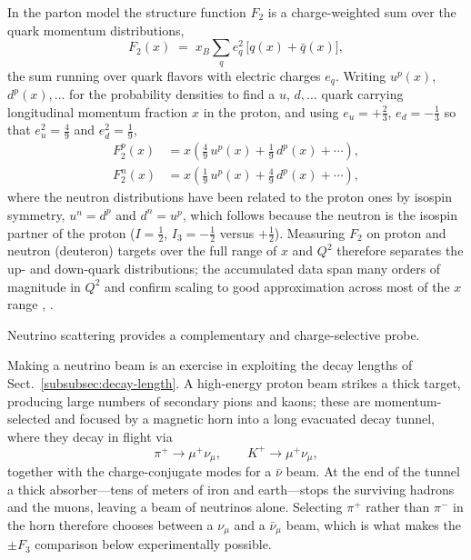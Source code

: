 In the parton model the structure function $F_{2}$ is a charge-weighted sum over the
quark momentum distributions,
\begin{equation}
    F_{2}(x) \;=\; x_{B}\sum_{q} e_{q}^{2}\,\bigl[q(x) + \bar q(x)\bigr],
    \label{eq:F2-parton}
\end{equation}
the sum running over quark flavors with electric charges $e_{q}$. Writing $u^{p}(x)$,
$d^{p}(x),\dots$ for the probability densities to find a $u$, $d,\dots$ quark carrying
longitudinal momentum fraction $x$ in the proton, and using $e_{u}=+\tfrac{2}{3}$,
$e_{d}=-\tfrac{1}{3}$ so that $e_{u}^{2}=\tfrac{4}{9}$ and $e_{d}^{2}=\tfrac{1}{9}$,
\begin{align}
    F_{2}^{p}(x) &= x\left(\tfrac{4}{9}\,u^{p}(x) + \tfrac{1}{9}\,d^{p}(x) + \cdots\right),
    \label{eq:F2p}\\
    F_{2}^{n}(x) &= x\left(\tfrac{1}{9}\,u^{p}(x) + \tfrac{4}{9}\,d^{p}(x) + \cdots\right),
    \label{eq:F2n}
\end{align}
where the neutron distributions have been related to the proton ones by isospin
symmetry, $u^{n}=d^{p}$ and $d^{n}=u^{p}$, which follows because the neutron is the
isospin partner of the proton ($I=\tfrac{1}{2}$, $I_{3}=-\tfrac{1}{2}$ versus
$+\tfrac{1}{2}$). Measuring $F_{2}$ on proton and neutron (deuteron) targets over the
full range of $x$ and $Q^{2}$ therefore separates the up- and down-quark distributions;
the accumulated data span many orders of magnitude in $Q^{2}$ and confirm scaling to
good approximation across most of the $x$ range \cite[Ch.~1]{Amsler2018},
\cite[Ch.~4.5]{ThomasWeise2001}.

Neutrino scattering provides a complementary and charge-selective probe.

Making a neutrino beam is an exercise in exploiting the decay lengths of
Sect.~\ref{subsubsec:decay-length}. A high-energy proton beam strikes a thick target,
producing large numbers of secondary pions and kaons; these are momentum-selected and
focused by a magnetic horn into a long evacuated decay tunnel, where they decay in flight
via
\begin{equation}
    \pi^{+} \to \mu^{+}\nu_{\mu},
    \qquad
    K^{+} \to \mu^{+}\nu_{\mu},
    \label{eq:nu-beam-production}
\end{equation}
together with the charge-conjugate modes for a $\bar\nu$ beam. At the end of the tunnel a
thick absorber---tens of meters of iron and earth---stops the surviving hadrons and the
muons, leaving a beam of neutrinos alone. Selecting $\pi^{+}$ rather than $\pi^{-}$ in the
horn therefore chooses between a $\nu_{\mu}$ and a $\bar\nu_{\mu}$ beam, which is what
makes the $\pm F_{3}$ comparison below experimentally possible.

